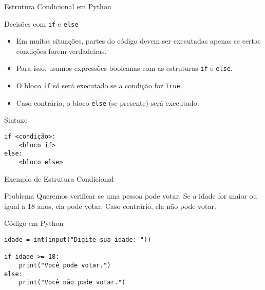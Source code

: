 \begin{frame}[fragile]{Estrutura Condicional em Python}

\begin{block}{Decisões com \texttt{if} e \texttt{else}}
\begin{itemize}
    \item Em muitas situações, partes do código devem ser executadas apenas se certas condições forem verdadeiras.
    \item Para isso, usamos expressões booleanas com as estruturas \texttt{if} e \texttt{else}.
    \item O bloco \texttt{if} só será executado se a condição for \texttt{True}.
    \item Caso contrário, o bloco \texttt{else} (se presente) será executado.
\end{itemize}
\end{block}

\vspace{0.5em}

\begin{block}{Sintaxe}
\begin{verbatim}
if <condição>:
    <bloco if>
else:
    <bloco else>
\end{verbatim}
\end{block}

\end{frame}

\begin{frame}[fragile]{Exemplo de Estrutura Condicional}

\begin{block}{Problema}
Queremos verificar se uma pessoa pode votar.  
Se a idade for maior ou igual a 18 anos, ela pode votar.  
Caso contrário, ela não pode votar.
\end{block}

\vspace{1em}

\begin{block}{Código em Python}
\begin{verbatim}
idade = int(input("Digite sua idade: "))

if idade >= 18:
    print("Você pode votar.")
else:
    print("Você não pode votar.")
\end{verbatim}
\end{block}

\end{frame}

